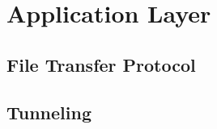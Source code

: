 \section{Application Layer}
\lipsum[17]
\subsection{File Transfer Protocol}
\lipsum[18]
\subsection{Tunneling}
\lipsum[19]